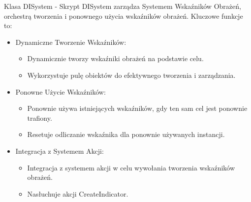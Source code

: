 Klasa DISystem -
Skrypt DISystem zarządza Systemem Wskaźników Obrażeń, orchestrą tworzenia i ponownego użycia wskaźników obrażeń. Kluczowe funkcje to:
\begin{itemize}
\item Dynamiczne Tworzenie Wskaźników:
\begin{itemize}
\item Dynamicznie tworzy wskaźniki obrażeń na podstawie celu.
\item Wykorzystuje pulę obiektów do efektywnego tworzenia i zarządzania.
\end{itemize}
\item Ponowne Użycie Wskaźników:
\begin{itemize}
\item Ponownie używa istniejących wskaźników, gdy ten sam cel jest ponownie trafiony.
\item Resetuje odliczanie wskaźnika dla ponownie używanych instancji.
\end{itemize}
\item Integracja z Systemem Akcji:
\begin{itemize}
\item Integracja z systemem akcji w celu wywołania tworzenia wskaźników obrażeń.
\item Nasłuchuje akcji CreateIndicator.
\end{itemize}
\end{itemize}

